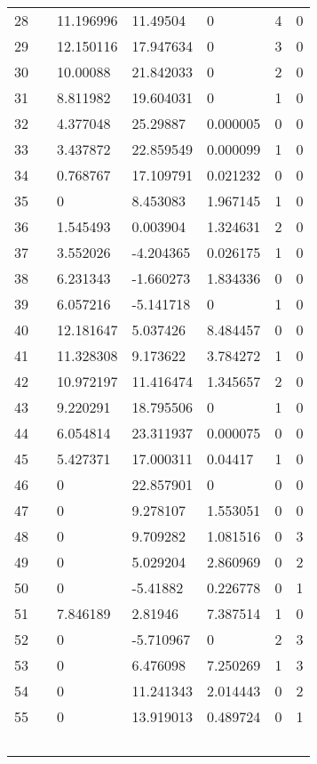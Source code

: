 \documentclass[letterpaper,10pt]{article} %
\begin{document}
\begin{table}  [ht]
\begin{tabular}{llllll}
28 & 11.196996 & 11.49504 & 0 & 4 & 0\\ 
29 & 12.150116 & 17.947634 & 0 & 3 & 0\\ 
30 & 10.00088 & 21.842033 & 0 & 2 & 0\\ 
31 & 8.811982 & 19.604031 & 0 & 1 & 0\\ 
32 & 4.377048 & 25.29887 & 0.000005 & 0 & 0\\ 
33 & 3.437872 & 22.859549 & 0.000099 & 1 & 0\\ 
34 & 0.768767 & 17.109791 & 0.021232 & 0 & 0\\ 
35 & 0 & 8.453083 & 1.967145 & 1 & 0\\ 
36 & 1.545493 & 0.003904 & 1.324631 & 2 & 0\\ 
37 & 3.552026 & -4.204365 & 0.026175 & 1 & 0\\ 
38 & 6.231343 & -1.660273 & 1.834336 & 0 & 0\\ 
39 & 6.057216 & -5.141718 & 0 & 1 & 0\\ 
40 & 12.181647 & 5.037426 & 8.484457 & 0 & 0\\ 
41 & 11.328308 & 9.173622 & 3.784272 & 1 & 0\\ 
42 & 10.972197 & 11.416474 & 1.345657 & 2 & 0\\ 
43 & 9.220291 & 18.795506 & 0 & 1 & 0\\ 
44 & 6.054814 & 23.311937 & 0.000075 & 0 & 0\\ 
45 & 5.427371 & 17.000311 & 0.04417 & 1 & 0\\ 
46 & 0 & 22.857901 & 0 & 0 & 0\\ 
47 & 0 & 9.278107 & 1.553051 & 0 & 0\\ 
48 & 0 & 9.709282 & 1.081516 & 0 & 3\\ 
49 & 0 & 5.029204 & 2.860969 & 0 & 2\\ 
50 & 0 & -5.41882 & 0.226778 & 0 & 1\\ 
51 & 7.846189 & 2.81946 & 7.387514 & 1 & 0\\ 
52 & 0 & -5.710967 & 0 & 2 & 3\\ 
53 & 0 & 6.476098 & 7.250269 & 1 & 3\\ 
54 & 0 & 11.241343 & 2.014443 & 0 & 2\\ 
55 & 0 & 13.919013 & 0.489724 & 0 & 1\\ 

		    \end{tabular}
	\end{table}

	
\end{document}
